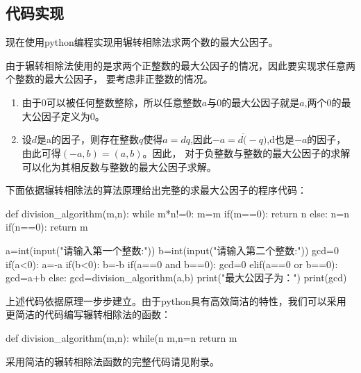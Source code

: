 \documentclass[UTF8]{ctexart}
\begin{document}
\subsection{代码实现}
\par 现在使用python编程实现用辗转相除法求两个数的最大公因子。
\par 由于辗转相除法使用的是求两个正整数的最大公因子的情况，因此要实现求任意两个整数的最大公因子，
要考虑非正整数的情况。
\begin{enumerate}[(1)]
\item 由于0可以被任何整数整除，所以任意整数$a$与0的最大公因子就是$a$,两个0的最大公因子定义为0。
\item 设$d$是a的因子，则存在整数$q$使得$a=dq$,因此$-a=d\dot (-q)$,d也是$-a$的因子，由此可得$(-a,b)=(a,b)$。因此，
对于负整数与整数的最大公因子的求解可以化为其相反数与整数的最大公因子求解。
\end{enumerate}
\par 下面依据辗转相除法的算法原理给出完整的求最大公因子的程序代码：
\begin{python}
  def division_algorithm(m,n):
    while m*n!=0:
        m=m%
        if(m==0):
            return n
        else:
            n=n%
            if(n==0):
                return m

  a=int(input("请输入第一个整数:"))
  b=int(input("请输入第二个整数:"))
  gcd=0
  if(a<0):
      a=-a
  if(b<0):
      b=-b
  if(a==0 and b==0):
      gcd=0
  elif(a==0 or b==0):
      gcd=a+b
  else:
      gcd=division_algorithm(a,b)
  print("最大公因子为：")
  print(gcd)
\end{python}
\par 上述代码依据原理一步步建立。由于python具有高效简洁的特性，我们可以采用更简洁的代码编写辗转相除法的函数：
\begin{python}
  def division_algorithm(m,n):
    while(n%
        m,n=n%
    return m
\end{python}
\par 采用简洁的辗转相除法函数的完整代码请见附录。
\end{document}
